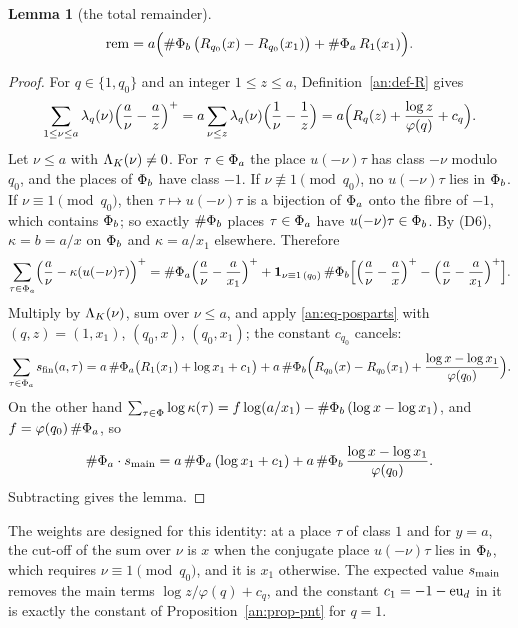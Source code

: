 \documentclass[10pt]{amsart}
\newtheorem{lemma}[theorem]{Lemma}
\theoremstyle{definition}
\theoremstyle{remark}
\begin{document}
\begin{lemma}[the total remainder]\label{an:lem-rem}
\[
 \operatorname{rem}=a\Bigl(\#\Phi_b\,\bigl(R_{q_0}(x)-R_{q_0}(x_1)\bigr)+\#\Phi_a\,R_1(x_1)\Bigr).
\]
\end{lemma}
\begin{proof}
For $q\in\{1,q_0\}$ and an integer $1\le z\le a$,
Definition~\ref{an:def-R} gives
\begin{equation}\label{an:eq-posparts}
 \sum_{1\le\nu\le a}\lambda_q(\nu)\Bigl(\frac a\nu-\frac az\Bigr)^{+}=a\sum_{\nu\le z}\lambda_q(\nu)\Bigl(\frac1\nu-\frac1z\Bigr)=a\Bigl(R_q(z)+\frac{\log z}{\varphi(q)}+c_q\Bigr).
\end{equation}
Let $\nu\le a$ with $\Lambda_K(\nu)\ne0$. For $\tau\in\Phi_a$ the place
$u(-\nu)\tau$ has class $-\nu$ modulo $q_0$, and the places of $\Phi_b$ have
class $-1$. If $\nu\not\equiv1\pmod{q_0}$, no $u(-\nu)\tau$ lies in $\Phi_b$.
If $\nu\equiv1\pmod{q_0}$, then $\tau\mapsto u(-\nu)\tau$ is a bijection of
$\Phi_a$ onto the fibre of $-1$, which contains $\Phi_b$; so exactly $\#\Phi_b$
places $\tau\in\Phi_a$ have $u(-\nu)\tau\in\Phi_b$. By (D6), $\kappa=b=a/x$ on
$\Phi_b$ and $\kappa=a/x_1$ elsewhere. Therefore
\[
 \sum_{\tau\in\Phi_a}\Bigl(\frac a\nu-\kappa(u(-\nu)\tau)\Bigr)^{+}
 =\#\Phi_a\Bigl(\frac a\nu-\frac a{x_1}\Bigr)^{+}+\mathbf 1_{\nu\equiv1\,(q_0)}\,\#\Phi_b\Bigl[\Bigl(\frac a\nu-\frac ax\Bigr)^{+}-\Bigl(\frac a\nu-\frac a{x_1}\Bigr)^{+}\Bigr].
\]
Multiply by $\Lambda_K(\nu)$, sum over $\nu\le a$, and apply
\eqref{an:eq-posparts} with $(q,z)=(1,x_1)$, $(q_0,x)$, $(q_0,x_1)$; the
constant $c_{q_0}$ cancels:
\[
 \sum_{\tau\in\Phi_a}s_{\mathrm{fin}}(a,\tau)=a\,\#\Phi_a\bigl(R_1(x_1)+\log x_1+c_1\bigr)+a\,\#\Phi_b\Bigl(R_{q_0}(x)-R_{q_0}(x_1)+\frac{\log x-\log x_1}{\varphi(q_0)}\Bigr).
\]
On the other hand
$\sum_{\tau\in\Phi}\log\kappa(\tau)=f\log(a/x_1)-\#\Phi_b\,(\log x-\log x_1)$,
and $f=\varphi(q_0)\,\#\Phi_a$, so
\[
 \#\Phi_a\cdot s_{\mathrm{main}}=a\,\#\Phi_a\,(\log x_1+c_1)+a\,\#\Phi_b\,\frac{\log x-\log x_1}{\varphi(q_0)} .
\]
Subtracting gives the lemma.
\end{proof}
The weights are designed for this identity: at a place $\tau$ of class $1$
and for $y=a$, the cut-off of the sum over $\nu$ is $x$ when the conjugate
place $u(-\nu)\tau$ lies in $\Phi_b$, which requires $\nu\equiv1\pmod{q_0}$,
and it is $x_1$ otherwise. The expected value $s_{\mathrm{main}}$ removes the main terms
$\log z/\varphi(q)+c_q$, and the constant $c_1=-1-\mathrm{eu}_d$ in it is exactly the
constant of Proposition~\ref{an:prop-pnt} for $q=1$.
\end{document}
